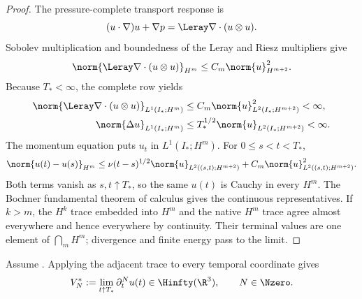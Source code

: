 \begin{proof}
The pressure-complete transport response is
\[
  (u\cdot\nabla)u+\nabla p
  =\Leray\nabla\cdot(u\otimes u).
\]
Sobolev multiplication and boundedness of the Leray and Riesz multipliers give
\[
  \norm{\Leray\nabla\cdot(u\otimes u)}_{H^m}
  \leq C_m\norm{u}_{H^{m+2}}^2.
\]
Because \(T_*<\infty\), the complete row yields
\begin{align*}
  \norm{\Leray\nabla\cdot(u\otimes u)}_{L^1(I_*;H^m)}
  &\leq C_m\norm{u}_{L^2(I_*;H^{m+2})}^{2}<\infty,\\
  \norm{\Delta u}_{L^1(I_*;H^m)}
  &\leq T_*^{1/2}\norm{u}_{L^2(I_*;H^{m+2})}<\infty.
\end{align*}
The momentum equation puts \(u_t\) in \(L^1(I_*;H^m)\).  For
\(0\leq s<t<T_*\),
\[
  \norm{u(t)-u(s)}_{H^m}
  \leq
  \nu(t-s)^{1/2}\norm{u}_{L^2((s,t);H^{m+2})}
  +C_m\norm{u}_{L^2((s,t);H^{m+2})}^{2}.
\]
Both terms vanish as \(s,t\uparrow T_*\), so the same \(u(t)\) is Cauchy in
every \(H^m\).  The Bochner fundamental theorem of calculus gives the
continuous representatives.  If \(k>m\), the \(H^k\) trace embedded into
\(H^m\) and the native \(H^m\) trace agree almost everywhere and hence
everywhere by continuity.  Their terminal values are one element of
\(\bigcap_mH^m\); divergence and finite energy pass to the limit.
\end{proof}

Assume .  Applying the adjacent
trace to every temporal coordinate gives
\begin{equation}\label{eq:SectionThreeVelocityJetTraces}
  V_N^*:=\lim_{t\uparrow T_*}\partial_t^Nu(t)
  \in\Hinfty(\R^3),
  \qquad N\in\Nzero.
\end{equation}


